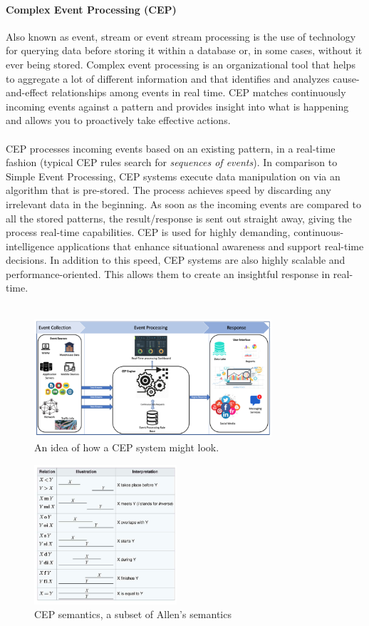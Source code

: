 \documentclass[10pt,a4paper]{article}
\newcommand{\nline}{\\~\\}
\begin{document}
\paragraph{Complex Event Processing (CEP)} 
Also known as event, stream or event stream processing is the use of technology for querying data before storing it within a database or, in some cases, without it ever being stored. Complex event processing is an organizational tool that helps to aggregate a lot of different information and that identifies and analyzes cause-and-effect relationships among events in real time. CEP matches continuously incoming events against a pattern and provides insight into what is happening and allows you to proactively take effective actions.
\nline
CEP processes incoming events based on an existing pattern, in a real-time fashion (typical CEP rules search for \textit{sequences of events}). In comparison to Simple Event Processing, CEP systems execute data manipulation on via an algorithm that is pre-stored. The process achieves speed by discarding any irrelevant data in the beginning. As soon as the incoming events are compared to all the stored patterns, the result/response is sent out straight away, giving the process real-time capabilities. CEP is used for highly demanding, continuous-intelligence applications that enhance situational awareness and support real-time decisions. In addition to this speed, CEP systems are also highly scalable and performance-oriented. This allows them to create an insightful response in real-time.
\nline

\begin{figure}[ht!]
 \hfill \includegraphics[width=250pt]{images/cep.png}\hspace*{\fill}
 \caption{An idea of how a CEP system might look.}
\end{figure} 

\begin{figure}[ht!]
 \hfill \includegraphics[width=150pt]{images/cep-semantics.png}\hspace*{\fill}
 \caption{CEP semantics, a subset of Allen's semantics}
\end{figure} 
\end{document}
